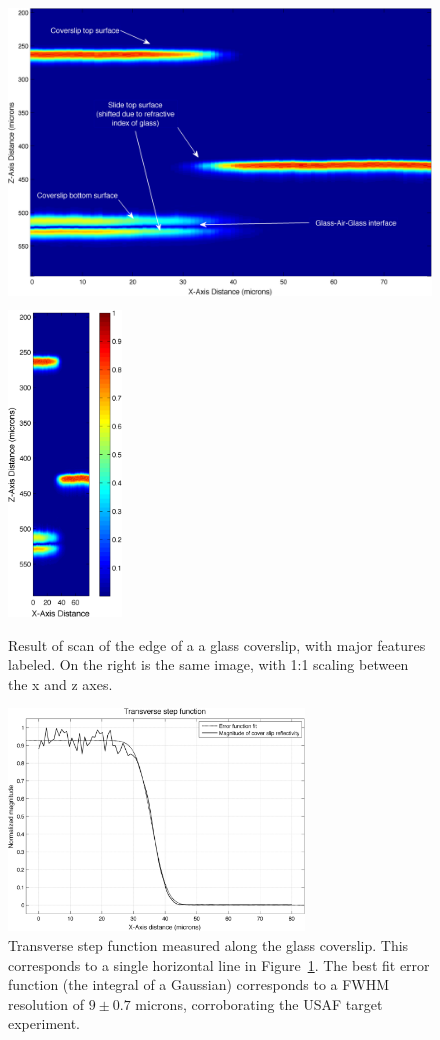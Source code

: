 \begin{figure}[h!]
\centering
\includegraphics[height=230pt]{Images/Results/coverslip_ann.png}
\includegraphics[height=230pt]{Images/Results/coverslip_equal.png}
\caption[Result of scan of the edge of a a glass coverslip.]{Result of scan of the edge of a a glass coverslip, with major features labeled. On the right is the same image, with 1:1 scaling between the x and z axes.\label{fig:coverslip1}}
\end{figure}

\begin{figure}[h!]
\centering
\includegraphics[width=0.7\textwidth]{Images/Results/line_step.png}
\caption[Transverse step function measured along the glass coverslip.]{Transverse step function measured along the glass coverslip. This corresponds to a single horizontal line in Figure~\ref{fig:coverslip1}. The best fit error function (the integral of a Gaussian) corresponds to a FWHM resolution of $9 \pm 0.7$ microns, corroborating the USAF target experiment.\label{fig:coverslip2}}
\end{figure}

